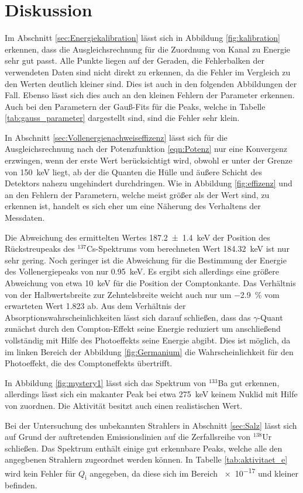 \section{Diskussion}
\label{sec:Diskussion}
Im Abschnitt \ref{sec:Energiekalibration} lässt sich in Abbildung \ref{fig:kalibration}
erkennen, dass die Ausgleichsrechnung für die Zuordnung von Kanal zu Energie
sehr gut passt. Alle Punkte liegen auf der Geraden, die Fehlerbalken der
verwendeten Daten sind nicht direkt zu erkennen, da die Fehler im Vergleich zu
den Werten deutlich kleiner sind. Dies ist auch in den folgenden Abbildungen
der Fall. Ebenso lässt sich dies auch an den kleinen Fehlern der Parameter erkennen.
Auch bei den Parametern der Gauß-Fits für die Peaks, welche in Tabelle
\ref{tab:gauss_parameter} dargestellt sind, sind die Fehler sehr klein.

In Abschnitt \ref{sec:Vollenergienachweiseffizenz} lässt sich für die Ausgleichsrechnung nach
der Potenzfunktion \ref{eqn:Potenz} nur eine Konvergenz erzwingen, wenn der erste Wert
berücksichtigt wird, obwohl er unter der Grenze von \SI{150}{\kilo\electronvolt}
liegt, ab der die Quanten die Hülle und äußere Schicht des Detektors nahezu ungehindert 
durchdringen. Wie in Abbildung \ref{fig:effizenz} und an den Fehlern der 
Parametern, welche meist größer als der Wert sind, zu erkennen ist, handelt es sich
eher um eine Näherung des Verhaltens der Messdaten.

Die Abweichung des ermittelten Wertes \SI{187.2(14)}{\kilo\electronvolt} der
Position des Rückstreupeaks des ${}^{137}$Cs-Spektrums vom
berechneten Wert \SI{184.32}{\kilo\electronvolt} ist nur sehr gering. Noch
geringer ist die Abweichung für die Bestimmung der Energie des Vollenergiepeaks
von nur \SI{0.95}{\kilo\electronvolt}. Es ergibt sich allerdings eine
größere Abweichung von etwa \SI{10}{\kilo\electronvolt} für die Position
der Comptonkante.
Das Verhältnis von der Halbwertsbreite zur Zehntelsbreite weicht auch nur 
um \SI{-2.9}{\percent} vom erwarteten Wert \num{1.823} ab. 
Aus dem Verhältnis der Absorptionswahrscheinlichkeiten lässt sich darauf schließen,
dass das $\gamma$-Quant zunächst durch den Compton-Effekt seine Energie reduziert
um anschließend vollständig mit Hilfe des Photoeffekts seine Energie abgibt.
Dies ist möglich, da im linken Bereich der Abbildung \ref{fig:Germanium}
die Wahrscheinlichkeit für den Photoeffekt, die des Comptoneffekts
übertrifft.

In Abbildung \ref{fig:mystery1} lässt sich das Spektrum von 
${}^{133}$Ba gut erkennen, allerdings lässt sich ein makanter 
Peak bei etwa \SI{275}{\kilo\electronvolt} keinem Nuklid 
mit Hilfe von \cite{referenz1} zuordnen. Die Aktivität besitzt auch
einen realistischen Wert.

Bei der Untersuchung des unbekannten Strahlers in Abschnitt \ref{sec:Salz}
lässt sich auf Grund der auftretenden Emissionslinien auf die Zerfallsreihe
von ${}^{138}$Ur schließen. Das Spektrum enthält einige gut erkennbare
Peaks, welche alle den angegbenen Strahlern zugeordnet werden können.
In Tabelle \ref{tab:aktivitaet_e} wird kein Fehler für $Q_\text{i}$
angegeben, da diese sich im Bereich \num{e-17} und kleiner befinden.